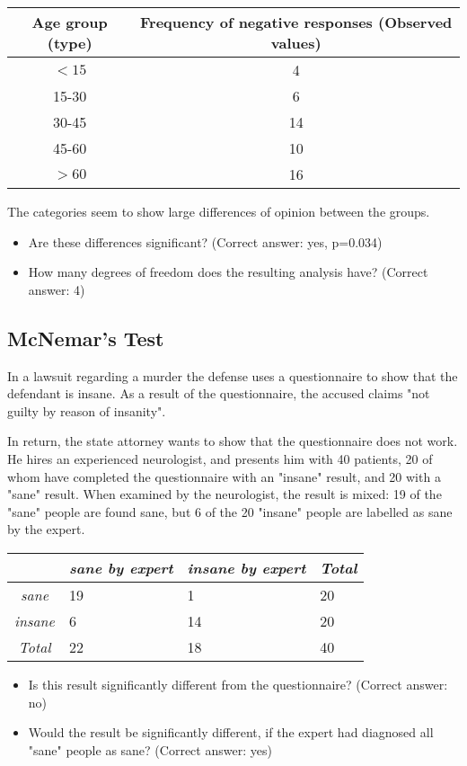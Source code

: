 \begin{table}[h]
    \centering
    \begin{tabular}{c|c}
      Age group (type) &	Frequency of negative responses (Observed values)\\
      \hline
      $<15$ & 4 \\
      15-30 & 6 \\
      30-45 & 14 \\
      45-60 & 10 \\
      $>60$ & 16
    \end{tabular}
\end{table}

The categories seem to show large differences of opinion between the groups.

\begin{itemize}
  \item     Are these differences significant?
    (Correct answer: yes, p=0.034)

  \item     How many degrees of freedom does the resulting analysis have?
    (Correct answer: 4)

\end{itemize}

\subsection{McNemar's Test}

In a lawsuit regarding a murder the defense uses a questionnaire to show that the defendant is insane. As a result of the questionnaire, the accused claims "not guilty by reason of insanity".

In return, the state attorney wants to show that the questionnaire does not work. He hires an experienced neurologist, and presents him with 40 patients, 20 of whom have completed the questionnaire with an "insane" result, and 20 with a "sane" result. When examined by the neurologist, the result is mixed: 19 of the "sane" people are found sane, but 6 of the 20 "insane" people are labelled as sane by the expert.

\begin{table}[h]
  \centering
  \begin{tabular}{|c|l l | l|}
  \hline
  & \emph{sane by expert} & \emph{insane by expert} & \emph{Total} \\
  \hline
  \emph{sane} & 19 & 1 & 20 \\
  \emph{insane} & 6 & 14 & 20 \\
  \hline
  \emph{Total} & 22 & 18 & 40 \\
  \hline
  \end{tabular}
\end{table}


\begin{itemize}
  \item     Is this result significantly different from the questionnaire?
    (Correct answer: no)

  \item     Would the result be significantly different, if the expert had diagnosed all "sane" people as sane?
    (Correct answer: yes)
\end{itemize} 